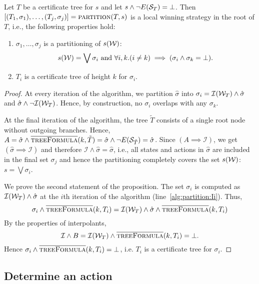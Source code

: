 \begin{proposition}\label{prop:partition}
    Let $T$ be a certificate tree for $s$ and let $s \land \lnot E(\mathcal{S}_T) = \bot$. Then $[(T_1, \sigma_1),\ldots,(T_j, \sigma_j)] = \textsc{partition}(T, s)$ is a local winning strategy in the root of $T$, i.e., the following properties hold:
    \begin{enumerate}
        \item $\sigma_1 ,\ldots, \sigma_j$ is a partitioning of
            $s(\mathcal{W})$: $$s(\mathcal{W}) = \bigvee \sigma_i \text{ and } \forall i, k. (i \neq k) \implies (\sigma_i \land \sigma_k = \bot).$$
        \item $T_i$ is a certificate tree of height $k$ for $\sigma_i$.
    \end{enumerate}
\end{proposition}
\begin{proof}
    At every iteration of the algorithm, we partition $\hat{\sigma}$ into $\sigma_i = \mathcal{I}(\mathcal{W}_T) \land \hat{\sigma}$ and $\hat{\sigma} \land \neg\mathcal{I}(\mathcal{W}_T)$. Hence, by construction, no $\sigma_i$ overlaps with any $\sigma_k$.

    At the final iteration of the algorithm, the tree $\tilde{T}$ consists of a single root node without outgoing branches.  Hence, $A = \hat{\sigma} \land \textsc{$\overline{\mbox{treeFormula}}$}(k, \tilde{T}) = \hat{\sigma} \land \neg E(\mathcal{S}_{\tilde{T}}) = \hat{\sigma}$.  Since $(A \implies \mathcal{I})$, we get $(\hat{\sigma} \implies \mathcal{I})$ and therefore $\mathcal{I} \land \hat{\sigma} = \hat{\sigma}$, i.e., all states and actions in $\hat{\sigma}$ are included in the final set $\sigma_j$ and hence the partitioning completely covers the set $s(\mathcal{W})$: $s=\bigvee \sigma_i$.

    We prove the second statement of the proposition.  The set $\sigma_i$ is computed as $\mathcal{I}(\mathcal{W}_T) \land \hat{\sigma}$ at the $i$th iteration of the algorithm (line~\ref{alg:partition:Ii}).
    Thus, $$\sigma_i \land \textsc{$\overline{\mbox{treeFormula}}$}(k, T_i) = \mathcal{I}(\mathcal{W}_T) \land \hat{\sigma} \land \textsc{$\overline{\mbox{treeFormula}}$}(k, T_i)$$ By the properties of interpolants, $$\mathcal{I} \land B = \mathcal{I}(\mathcal{W}_T) \land \textsc{$\overline{\mbox{treeFormula}}$}(k, T_i) = \bot.$$  Hence $\sigma_i \land \textsc{$\overline{\mbox{treeFormula}}$}(k, T_i) = \bot$, i.e. $T_i$ is a certificate tree for $\sigma_i$.
\end{proof}

\subsection{Determine an action}

